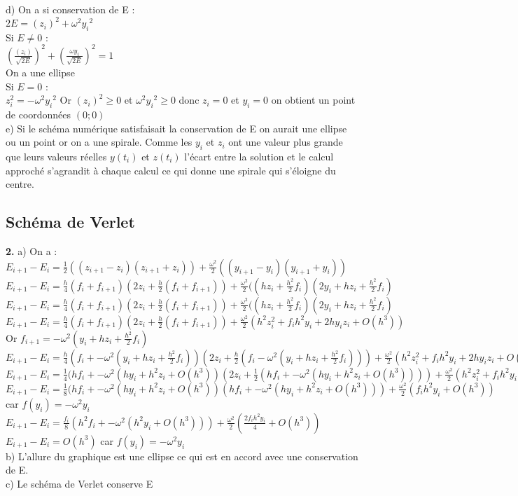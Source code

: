 \documentclass{article}
\begin{document}
d) On  a si conservation de E : \\
$2E= (z_{i})^2 + \omega^2 {y_i}^2$ \\
Si $E \neq 0$ :\\
$(\frac{(z_{i})}{\sqrt{2E}})^2 + (\frac{\omega y_i}{\sqrt{2E}})^2=1$ \\
On a une ellipse \\
Si $E=0$ : \\
$z_{i}^2 = - \omega^2 {y_i}^2$ Or $(z_i)^2 \geq 0$ et $\omega^2 {y_i}^2 \geq 0$ donc $z_i=0$ et $y_i=0$ on obtient un point de coordonnées $(0;0)$ \\
e) Si le schéma numérique satisfaisait la conservation de E on aurait une ellipse ou un point or on a une spirale. Comme les $y_i$ et $z_i$ ont une valeur plus grande que leurs valeurs réelles $y(t_i)$ et $z(t_i)$ l'écart entre la solution et le calcul approché s'agrandit à chaque calcul ce qui donne une spirale qui s'éloigne du centre. \\
\subsection{Schéma de Verlet}

{\bf 2.} a) On a : \\
$E_{i+1}-E_i =\frac{1}{2} ((z_{i+1} -z_i) (z_{i+1} +z_i)) + \frac{\omega^2}{2}((y_{i+1}-y_i)(y_{i+1}+y_i)) $ \\
$E_{i+1}-E_i =\frac{h}{4}(f_i + f_{i+1})(2z_i +\frac{h}{2}(f_i+f_{i+1})) + \frac{\omega^2}{2}((hz_i + \frac{h^2}{2}f_i)(2y_i+hz_i + \frac{h^2}{2}f_i)$ \\
$E_{i+1}-E_i =\frac{h}{4}(f_i + f_{i+1})(2z_i +\frac{h}{2}(f_i+f_{i+1})) + \frac{\omega^2}{2}((hz_i + \frac{h^2}{2}f_i)(2y_i+hz_i + \frac{h^2}{2}f_i)$ \\
$E_{i+1}-E_i =\frac{h}{4}(f_i + f_{i+1})(2z_i +\frac{h}{2}(f_i+f_{i+1})) + \frac{\omega^2}{2}(h^2z_i^2+f_ih^2y_i+2hy_iz_i +O(h^3))$ \\
Or $f_{i+1}=-\omega^2(y_i+hz_i+\frac{h^2}{2}f_i)$ \\
$E_{i+1}-E_i =\frac{h}{4}(f_i + -\omega^2(y_i+hz_i+\frac{h^2}{2}f_i))(2z_i +\frac{h}{2}(f_i-\omega^2(y_i+hz_i+\frac{h^2}{2}f_i))) + \frac{\omega^2}{2}(h^2z_i^2+f_ih^2y_i+2hy_iz_i +O(h^3))$ \\
$E_{i+1}-E_i =\frac{1}{4}(hf_i + -\omega^2(hy_i+h^2z_i+ O(h^3))(2z_i +\frac{1}{2}(hf_i+-\omega^2(hy_i+h^ 2z_i+ O(h^3)))) + \frac{\omega^2}{2}(h^2z_i^2+f_ih^2y_i+2hy_iz_i +O(h^3))$ \\
$E_{i+1}-E_i =\frac{1}{8}(hf_i + -\omega^2(hy_i+h^2z_i+ O(h^3))(hf_i+-\omega^2(hy_i+h^ 2z_i+ O(h^3))) + \frac{\omega^2}{2}(f_ih^2y_i+O(h^3))$ car $f(y_i)=-\omega^2 y_i$ \\
$E_{i+1}-E_i = \frac{f_i}{8}(h^2f_i+-\omega^2(h^2y_i+O(h^3))) + \frac{\omega^2}{2}(\frac{2f_ih^2y_i}{4}+O(h^3))$ \\
$E_{i+1}-E_i=O(h^3)$ car $f(y_i)=-\omega^2y_i$ \\
b) L'allure du graphique est une ellipse ce qui est en accord avec une conservation de E. \\
c) Le schéma de Verlet conserve E
\end{document}
